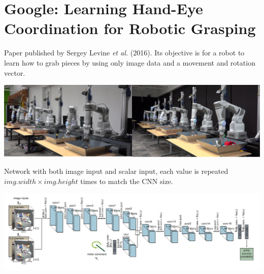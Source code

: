 
\section{Google: Learning Hand-Eye Coordination for Robotic Grasping}

\begin{frame}{\insertsec}
Paper published by Sergey Levine \emph{et al.} (2016).
Its objective is for a robot to learn how to grab pieces by using only image data and a movement
and rotation vector.

\begin{center}
    \includegraphics[width=.9\textwidth]{images/google_robot}
\end{center}
\end{frame}


\begin{frame}
Network with both image input and scalar input, each value is repeated 
\(img.width \times img.height\) times to match the CNN size.
\begin{center}
    \includegraphics[width=\textwidth]{images/google_robot_network}
\end{center}
\end{frame}